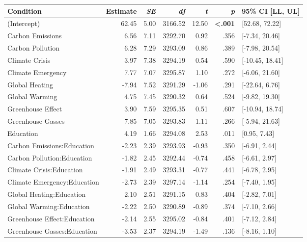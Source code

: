 \begin{table}[ht]
\centering
\begin{tabular}{lrrrrrl}
  \hline
Condition & Estimate & \textit{SE} & \textit{df} & \textit{t} & \textit{p} & 95\% CI [LL, UL] \\ 
  \hline
(Intercept) & 62.45 & 5.00 & 3166.52 & 12.50 & \textbf{\textless  .001} & [52.68, 72.22] \\ 
  Carbon Emissions & 6.56 & 7.11 & 3292.70 & 0.92 & .356 & [-7.34, 20.46] \\ 
  Carbon Pollution & 6.28 & 7.29 & 3293.09 & 0.86 & .389 & [-7.98, 20.54] \\ 
  Climate Crisis & 3.97 & 7.38 & 3294.19 & 0.54 & .590 & [-10.45, 18.41] \\ 
  Climate Emergency & 7.77 & 7.07 & 3295.87 & 1.10 & .272 & [-6.06, 21.60] \\ 
  Global Heating & -7.94 & 7.52 & 3291.29 & -1.06 & .291 & [-22.64, 6.76] \\ 
  Global Warming & 4.75 & 7.45 & 3290.32 & 0.64 & .524 & [-9.82, 19.30] \\ 
  Greenhouse Effect & 3.90 & 7.59 & 3295.35 & 0.51 & .607 & [-10.94, 18.74] \\ 
  Greenhouse Gasses & 7.85 & 7.05 & 3293.83 & 1.11 & .266 & [-5.94, 21.63] \\ 
  Education & 4.19 & 1.66 & 3294.08 & 2.53 & .011 & [0.95, 7.43] \\ 
  Carbon Emissions:Education & -2.23 & 2.39 & 3293.93 & -0.93 & .350 & [-6.91, 2.44] \\ 
  Carbon Pollution:Education & -1.82 & 2.45 & 3292.44 & -0.74 & .458 & [-6.61, 2.97] \\ 
  Climate Crisis:Education & -1.91 & 2.49 & 3293.31 & -0.77 & .441 & [-6.78, 2.95] \\ 
  Climate Emergency:Education & -2.73 & 2.39 & 3297.14 & -1.14 & .254 & [-7.40, 1.95] \\ 
  Global Heating:Education & 2.10 & 2.51 & 3291.15 & 0.83 & .404 & [-2.82, 7.01] \\ 
  Global Warming:Education & -2.22 & 2.50 & 3290.89 & -0.89 & .374 & [-7.10, 2.66] \\ 
  Greenhouse Effect:Education & -2.14 & 2.55 & 3295.02 & -0.84 & .401 & [-7.12, 2.84] \\ 
  Greenhouse Gasses:Education & -3.53 & 2.37 & 3294.19 & -1.49 & .136 & [-8.16, 1.10] \\ 
   \hline
\end{tabular}
\end{table}
